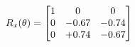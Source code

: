 \documentclass[preview]{standalone}
\begin{document}
\begin{align*}
\special{dvisvgm:raw <g id='unique000'>}R_{x}(\theta) = \begin{bmatrix}1 & 0 & 0 \\0 & -0.67 & -0.74 \\0 & +0.74 & -0.67\end{bmatrix}\special{dvisvgm:raw </g>}
\end{align*}
\end{document}
